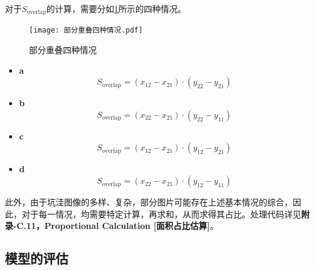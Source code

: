 \documentclass{MathorCupmodeling}
\begin{document}
\begin{itemize}
		对于$S_{\text{overlap}}$的计算，需要分如\textcolor{blue}{\cref{fig:部分重叠四种情况}}所示的四种情况。
		\begin{figure}[H]
			\centering
			\texttt{[image: 部分重叠四种情况.pdf]}
			\caption{部分重叠四种情况}
			\label{fig:部分重叠四种情况}
		\end{figure}
		\begin{itemize}
			\item \textbf{a}
			\begin{equation}
				S_{\text{overlap}}=\left(x_{12}-x_{21}\right)\cdot\left(y_{22}-y_{21}\right)
			\end{equation}
			\item \textbf{b}
			\begin{equation}
				S_{\text{overlap}}=\left(x_{22}-x_{21}\right)\cdot\left(y_{22}-y_{11}\right)
			\end{equation}
			\item \textbf{c}
			\begin{equation}
				S_{\text{overlap}}=\left(x_{12}-x_{21}\right)\cdot\left(y_{12}-y_{21}\right)
			\end{equation}
			\item \textbf{d}
			\begin{equation}
				S_{\text{overlap}}=\left(x_{22}-x_{21}\right)\cdot\left(y_{12}-y_{11}\right)
			\end{equation}
		\end{itemize}
	\end{itemize}

	此外，由于坑洼图像的多样、复杂，部分图片可能存在上述基本情况的综合，因此，对于每一情况，均需要特定计算，再求和，从而求得其占比。处理代码详见\textbf{附录-C.11，Proportional Calculation [面积占比估算]}。
	\subsection{模型的评估}\label{模型效果分析}
\end{document}
